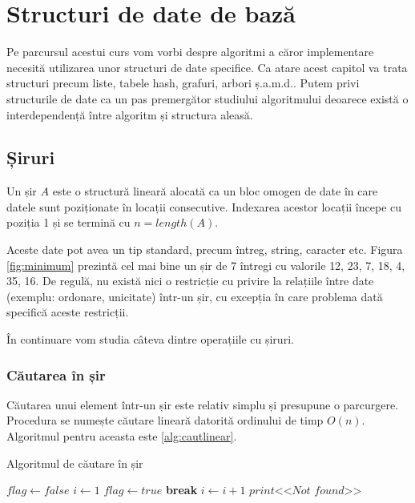 \chapter{Structuri de date de bază}
\label{abody}%

Pe parcursul acestui curs vom vorbi despre algoritmi a căror implementare necesită utilizarea unor structuri de date specifice.
Ca atare acest capitol va trata structuri precum liste, tabele hash, grafuri, arbori ș.a.m.d.. Putem privi structurile de date ca un pas premergător studiului algoritmului deoarece există o interdependență între algoritm și structura aleasă.

\section{Șiruri}

Un șir $A$ este o structură lineară alocată ca un bloc omogen de date în care datele sunt poziționate în locații consecutive. Indexarea acestor locații începe cu poziția 1 și se termină cu $n=length(A)$. 

Aceste date pot avea un tip standard, precum întreg, string, caracter etc. Figura \ref{fig:minimum} prezintă cel mai bine un șir de 7 întregi cu valorile {12, 23, 7, 18, 4, 35, 16}. De regulă, nu există nici o restricție cu privire la relațiile între date (exemplu: ordonare, unicitate) într-un șir, cu excepția în care problema dată specifică aceste restricții.

În continuare vom studia câteva dintre operațiile cu șiruri.

\subsection{Căutarea în șir}

Căutarea unui element într-un șir este relativ simplu și presupune o parcurgere. Procedura se numește căutare lineară datorită ordinului de timp $O(n)$. Algoritmul pentru aceasta este \ref{alg:cautlinear}.

\begin{algorithm}[H]
	\caption{Algoritmul de căutare în șir}\label{alg:cautlinear}
	\begin{algorithmic}[1]
		\State $flag \gets false$
		\State $i \gets 1$
		\State $flag \gets true$
		\State \textbf{break}
		\EndIf 
		\State $i \gets i+1$
		\EndWhile 
		\State $print \textit{<<Not found>>}$
		\EndIf 
		\EndProcedure
	\end{algorithmic}
\end{algorithm}

